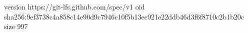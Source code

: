 version https://git-lfs.github.com/spec/v1
oid sha256:9ef3738c4a858c14e90d9c7946c10f5b13ec921e22ddb46d3f6f8710c2b1b20c
size 997
